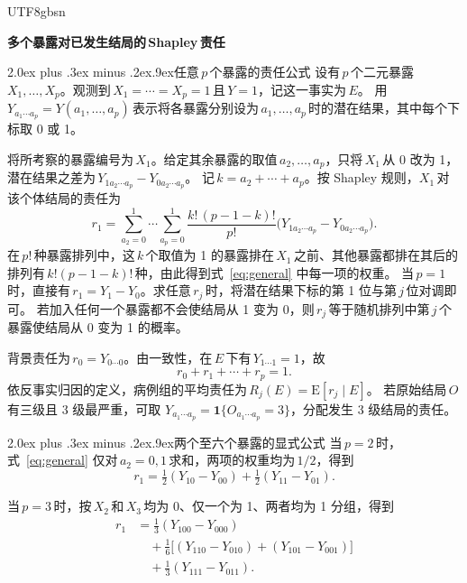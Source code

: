 \documentclass[11pt,a4paper]{article}
\makeatletter
\renewcommand{\section}{\@startsection{section}{1}{0pt}
  {2.0ex plus .3ex minus .2ex}{.9ex}{\normalfont\large\bfseries}}
\makeatother
\begin{document}
\ifPDFTeX\begin{CJK*}{UTF8}{gbsn}\fi
\begin{center}
  {\LARGE\bfseries 多个暴露对已发生结局的\,Shapley\,责任}
\end{center}

\section{任意\,$p$\,个暴露的责任公式}
设有\,$p$\,个二元暴露\,$X_1,\ldots,X_p$。观测到\,$X_1=\cdots=X_p=1$\,且\,$Y=1$，记这一事实为\,$E$。
用\,$Y_{a_1\cdots a_p}=Y(a_1,\ldots,a_p)$\,表示将各暴露分别设为\,$a_1,\ldots,a_p$\,时的潜在结果，其中每个下标取 0 或 1。

将所考察的暴露编号为\,$X_1$。给定其余暴露的取值\,$a_2,\ldots,a_p$，只将\,$X_1$\,从 0 改为 1，潜在结果之差为\,$Y_{1a_2\cdots a_p}-Y_{0a_2\cdots a_p}$。
记\,$k=a_2+\cdots+a_p$。按 Shapley 规则\cite{shapley}，$X_1$\,对该个体结局的责任为
\begin{equation}\label{eq:general}
r_1=
\sum_{a_2=0}^{1}\cdots\sum_{a_p=0}^{1}
\frac{k!\,(p-1-k)!}{p!}
\bigl(Y_{1a_2\cdots a_p}-Y_{0a_2\cdots a_p}\bigr).
\end{equation}
在\,$p!$\,种暴露排列中，这\,$k$\,个取值为 1 的暴露排在\,$X_1$\,之前、其他暴露都排在其后的排列有\,$k!(p-1-k)!$\,种，由此得到式~\eqref{eq:general} 中每一项的权重。
当\,$p=1$\,时，直接有\,$r_1=Y_1-Y_0$。求任意\,$r_j$\,时，将潜在结果下标的第 1 位与第\,$j$\,位对调即可。
若加入任何一个暴露都不会使结局从 1 变为 0，则\,$r_j$\,等于随机排列中第\,$j$\,个暴露使结局从 0 变为 1 的概率。

背景责任为\,$r_0=Y_{0\cdots0}$。由一致性，在\,$E$\,下有\,$Y_{1\cdots1}=1$，故
\[
  r_0+r_1+\cdots+r_p=1 .
\]
依反事实归因的定义\cite{luo}，病例组的平均责任为\,$R_j(E)=\mathrm{E}[r_j\mid E]$。
若原始结局\,$O$\,有三级且 3 级最严重，可取
$Y_{a_1\cdots a_p}=\mathbf{1}\{O_{a_1\cdots a_p}=3\}$，分配发生 3 级结局的责任。

\section{两个至六个暴露的显式公式}
当\,$p=2$\,时，式~\eqref{eq:general} 仅对\,$a_2=0,1$\,求和，两项的权重均为\,$1/2$，得到
\begin{equation}\label{eq:p2}
r_1 = \tfrac{1}{2}(Y_{10}-Y_{00})+\tfrac{1}{2}(Y_{11}-Y_{01}).
\end{equation}

当\,$p=3$\,时，按\,$X_2$\,和\,$X_3$\,均为 0、仅一个为 1、两者均为 1 分组，得到
\begin{equation}\label{eq:p3}
\begin{split}
r_1 &= \tfrac{1}{3}(Y_{100}-Y_{000}) \\[2pt]
    &\quad + \tfrac{1}{6}\bigl[(Y_{110}-Y_{010})+(Y_{101}-Y_{001})\bigr] \\[2pt]
    &\quad + \tfrac{1}{3}(Y_{111}-Y_{011}).
\end{split}
\end{equation}


\end{CJK*}
\end{document}
